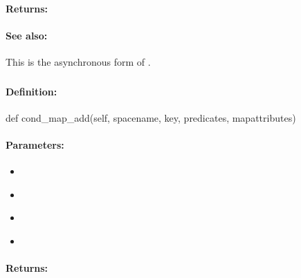 \paragraph{Returns:}


\paragraph{See also:}  This is the asynchronous form of .

\pagebreak
\subsubsection{}
\label{api:python:cond_map_add}


\paragraph{Definition:}
\begin{pythoncode}
def cond_map_add(self, spacename, key, predicates, mapattributes)
\end{pythoncode}

\paragraph{Parameters:}
\begin{itemize}[noitemsep]
\item {}\\

\item {}\\

\item {}\\

\item {}\\

\end{itemize}

\paragraph{Returns:}


